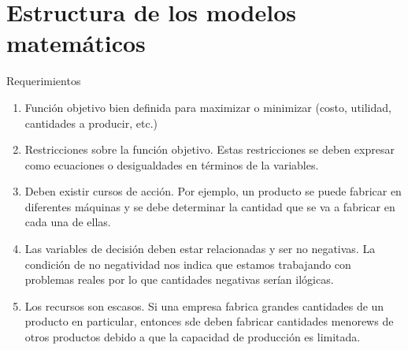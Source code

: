 \section{Estructura de los modelos matemáticos}
\label{sec:formulations}

\begin{frame}{Requerimientos}
  \begin{enumerate} \parskip2mm \justifying
  \item<only@1> Función objetivo bien definida para maximizar o minimizar (costo, utilidad, cantidades a producir, etc.) 
  \item<only@1> Restricciones sobre la función objetivo. Estas restricciones se deben expresar como ecuaciones o desigualdades en términos de la variables.
  \item<only@1> Deben existir cursos de acción. Por ejemplo, un producto se puede fabricar en diferentes máquinas y se debe determinar la cantidad que se va a fabricar en cada una de ellas. 
  \item<only@2> Las variables de decisión deben estar relacionadas y ser no negativas. La condición de no negatividad nos indica que estamos trabajando con problemas reales por lo que cantidades negativas serían ilógicas.
  \item<only@2> Los recursos son escasos. Si una empresa fabrica grandes cantidades de un producto en particular, entonces sde deben fabricar cantidades menorews de otros productos debido a que la capacidad de producción es limitada.
  \end{enumerate}
\end{frame}

